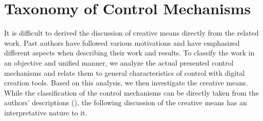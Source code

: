 

\section{Taxonomy of Control Mechanisms}\label{sec:taxo_control_mechanism}



It is difficult to derived the discussion of creative means directly from the related work. Past authors have followed various motivations and have emphasized different aspects when describing their work and results. To classify the work in an objective and unified manner, we analyze the actual presented control mechanisms and relate them to general characteristics of control with digital creation tools. Based on this analysis, we then investigate the creative means. While the classification of the control mechanisms can be directly taken from the authors' descriptions (), the following discussion of the creative means has an interpretative nature to it. 

